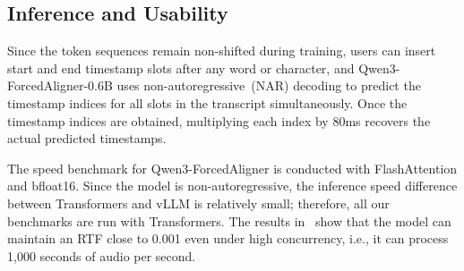 \subsection{Inference and Usability}
Since the token sequences remain non-shifted during training, users can insert start and end timestamp slots after any word or character, and Qwen3-ForcedAligner-0.6B uses non-autoregressive~(NAR) decoding to predict the timestamp indices for all slots in the transcript simultaneously. Once the timestamp indices are obtained, multiplying each index by 80ms recovers the actual predicted timestamps.

The speed benchmark for Qwen3-ForcedAligner is conducted with FlashAttention and bfloat16. Since the model is non-autoregressive, the inference speed difference between Transformers and vLLM is relatively small; therefore, all our benchmarks are run with Transformers. The results in~ show that the model can maintain an RTF close to 0.001 even under high concurrency, i.e., it can process 1,000 seconds of audio per second.

